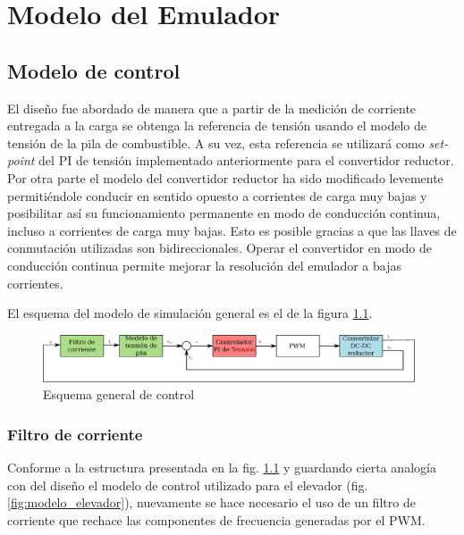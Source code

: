 \chapter{Modelo del Emulador}
\section{Modelo de control}
El diseño fue abordado de manera que a partir de la medición de corriente entregada a la carga se obtenga la referencia de tensión usando el
modelo de tensión de la pila de combustible. A su vez, esta referencia se utilizará como \emph{set-point} del PI de tensión implementado
anteriormente para el convertidor reductor. Por otra parte el modelo del convertidor reductor ha sido modificado levemente permitiéndole
conducir en sentido opuesto a corrientes de carga muy bajas y posibilitar así su funcionamiento permanente en modo de conducción continua, incluso
a corrientes de carga muy bajas. Esto es posible gracias a que las llaves de conmutación utilizadas son bidireccionales. Operar el convertidor
en modo de conducción continua permite mejorar la resolución del emulador a bajas corrientes.

El esquema del modelo de simulación general es el de la figura \ref{fig:esquema_control}.

\begin{figure}[H]
  \centering
  \includegraphics[width=11cm]{gfx/esquema_control.eps}
  \caption{Esquema general de control}
  \label{fig:esquema_control}
\end{figure}

\subsection{Filtro de corriente}
Conforme a la estructura presentada en la fig. \ref{fig:esquema_control} y guardando cierta analogía con del diseño el modelo de control utilizado para el
elevador (fig. \ref{fig:modelo_elevador}), nuevamente se hace necesario el uso de un filtro de corriente que rechace las componentes de frecuencia generadas
por el PWM.


